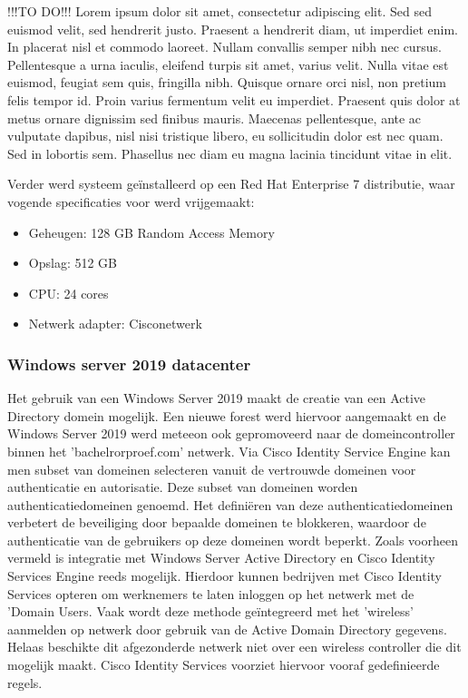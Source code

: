   \newline
	!!!TO DO!!! Lorem ipsum dolor sit amet, consectetur adipiscing elit. Sed sed euismod velit, sed hendrerit justo. Praesent a hendrerit diam, ut imperdiet enim. In placerat nisl et commodo laoreet. Nullam convallis semper nibh nec cursus. Pellentesque a urna iaculis, eleifend turpis sit amet, varius velit. Nulla vitae est euismod, feugiat sem quis, fringilla nibh. Quisque ornare orci nisl, non pretium felis tempor id. Proin varius fermentum velit eu imperdiet. Praesent quis dolor at metus ornare dignissim sed finibus mauris. Maecenas pellentesque, ante ac vulputate dapibus, nisl nisi tristique libero, eu sollicitudin dolor est nec quam. Sed in lobortis sem. Phasellus nec diam eu magna lacinia tincidunt vitae in elit.
 
Verder werd systeem geïnstalleerd op een Red Hat Enterprise 7 distributie, waar vogende specificaties voor werd vrijgemaakt: 

\begin{itemize}
	\item Geheugen: 128 GB Random Access Memory
	\item Opslag: 512 GB
	\item CPU: 24 cores
	\item Netwerk adapter: Cisco\textunderscore netwerk
\end{itemize}

\subsubsection{Windows server 2019 datacenter}
Het gebruik van een Windows Server 2019 maakt de creatie van een Active Directory domein mogelijk. Een nieuwe forest werd hiervoor aangemaakt en de Windows Server 2019 werd meteeon ook gepromoveerd naar de domeincontroller binnen het 'bachelrorproef.com' netwerk.
\newline
\newline
Via Cisco Identity Service Engine kan men subset van domeinen selecteren vanuit de vertrouwde domeinen voor authenticatie en autorisatie. Deze subset van domeinen worden authenticatiedomeinen genoemd. Het definiëren van deze authenticatiedomeinen verbetert de beveiliging door bepaalde domeinen te blokkeren, waardoor de authenticatie van de gebruikers op deze domeinen wordt beperkt.
\newline
\newline
Zoals voorheen vermeld is integratie met Windows Server Active Directory en Cisco Identity Services Engine reeds mogelijk. Hierdoor kunnen bedrijven met Cisco Identity Services opteren om werknemers te laten inloggen op het netwerk met de 'Domain Users. Vaak wordt deze methode geïntegreerd met het 'wireless' aanmelden op netwerk door gebruik van de Active Domain Directory gegevens. Helaas beschikte dit afgezonderde netwerk niet over een wireless controller die dit mogelijk maakt. Cisco Identity Services voorziet hiervoor vooraf gedefinieerde regels.

